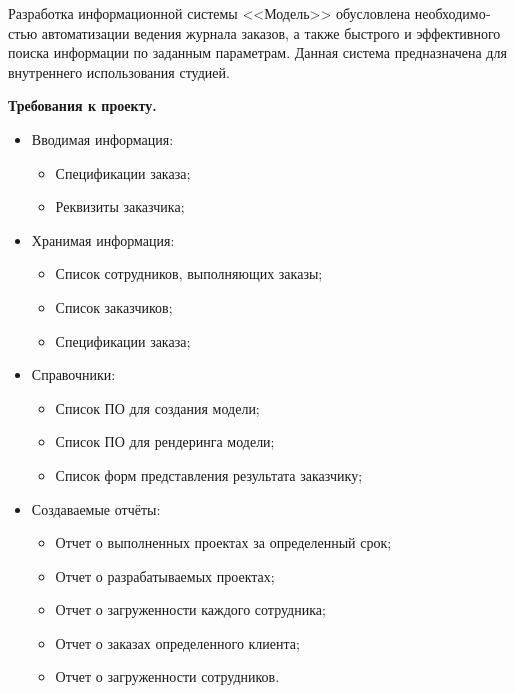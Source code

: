 \documentclass[a4paper, 12pt, titlepage]{article}
\begin{document}
\begin{otherlanguage}{russian}
\par Разработка информационной системы <<Модель>> обусловлена необходимостью автоматизации ведения журнала заказов, а также быстрого и эффективного поиска информации по заданным параметрам. Данная система предназначена для внутреннего использования студией.

\begin{center}
  \textbf{Требования к проекту.}
\end{center}

\begin{itemize}
\item Вводимая информация:
  \begin{itemize}
  \item Спецификации заказа;
  \item Реквизиты заказчика;
  \end{itemize}
\item Хранимая информация:
  \begin{itemize}
  \item Список сотрудников, выполняющих заказы;
  \item Список заказчиков;
  \item Спецификации заказа;
  \end{itemize}

\item Справочники:
  \begin{itemize}
  \item Список ПО для создания модели;
  \item Список ПО для рендеринга модели;
  \item Список форм представления результата заказчику;
  \end{itemize}
  
\item Создаваемые отчёты:
  \begin{itemize}
  \item Отчет о выполненных проектах за определенный срок;
  \item Отчет о разрабатываемых проектах;
  \item Отчет о загруженности каждого сотрудника;
  \item Отчет о заказах определенного клиента;
  \item Отчет о загруженности сотрудников.
  \end{itemize}
  
\end{itemize}

\newpage


\end{otherlanguage}
\end{document}
